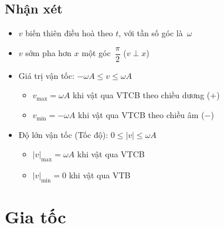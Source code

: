 \documentclass[12pt]{article}
\begin{document}
	\subsection{Nhận xét}
		\vspace{5pt}
		\begin{itemize}
			\item \(v\) biến thiên điều hoà theo \(t\), với tần số góc là \(\,\omega\)
			\item \(v\) sớm pha hơn \(x\) một góc \( \, \dfrac{\pi}{2}\) \: (\( v \perp x \))
			\item Giá trị vận tốc: \quad \( -\omega A \leq v \leq \omega A \)
				\begin{itemize}[label=\textopenbullet]
					\item \( v_\text{max} = \omega A \) khi vật qua VTCB theo chiều dương (\(+\))
					\item \( v_\text{min} = - \omega A \) khi vật qua VTCB theo chiều âm (\(-\))
				\end{itemize}
			\item Độ lớn vận tốc (Tốc độ): \quad \( 0 \leq \lvert v \rvert \leq \omega A \)
				\begin{itemize}[label=\textopenbullet]
					\item \( {\lvert v \rvert}_\text{max} = \omega A \) khi vật qua VTCB
					\item \( {\lvert v \rvert}_\text{min} = 0 \) khi vật qua VTB
				\end{itemize}
		\end{itemize}

\newpage
\section{Gia tốc}
\end{document}
